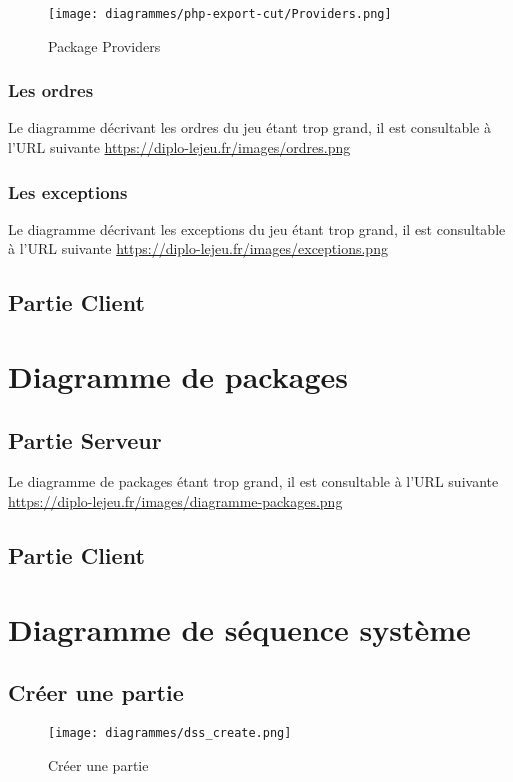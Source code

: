 			\begin{figure}[H]
				\centering
                \texttt{[image: diagrammes/php-export-cut/Providers.png]}
                \caption{\label{pproviders}Package Providers}
			\end{figure}

		\subsubsection{Les ordres}
        Le diagramme décrivant les ordres du jeu étant trop grand, il est consultable à l'URL suivante \url{https://diplo-lejeu.fr/images/ordres.png}

		\subsubsection{Les exceptions}
        Le diagramme décrivant les exceptions du jeu étant trop grand, il est consultable à l'URL suivante \url{https://diplo-lejeu.fr/images/exceptions.png}

    \pagebreak
	\subsection{Partie Client}

\section{Diagramme de packages}
	\subsection{Partie Serveur}

        Le diagramme de packages étant trop grand, il est consultable à l'URL suivante \url{https://diplo-lejeu.fr/images/diagramme-packages.png}

	\subsection{Partie Client}

\section{Diagramme de séquence système}
	\subsection{Créer une partie}
		\vspace{10mm}
		\begin{figure}[H]
			\centering
			\texttt{[image: diagrammes/dss\_create.png]}
			\caption{Créer une partie}
		\end{figure}

